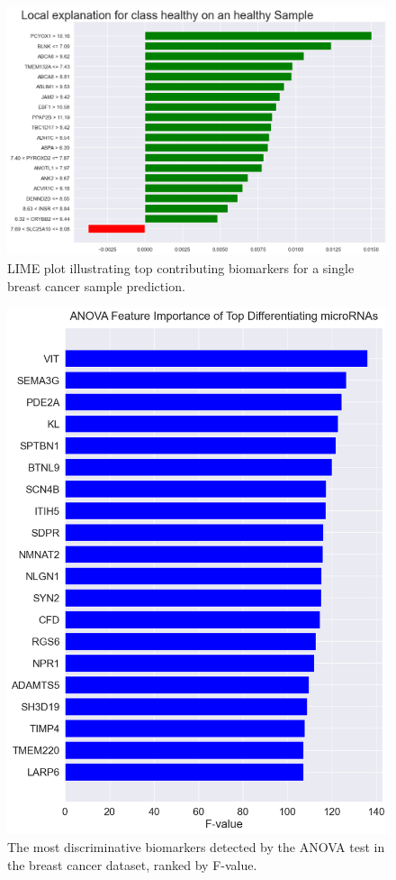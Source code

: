 \documentclass[journal]{IEEEtran}
\begin{document}

\begin{figure}[htbp]
\centering
\includegraphics[width=\linewidth]{breast_cancer_figures/differential/lime_local_explanation_plot_healthy.png}
\caption{LIME plot illustrating top contributing biomarkers for a single breast cancer sample prediction.}
\label{fig:breast_lime_bar}
\end{figure}

\begin{figure}[htbp]
\centering
\includegraphics[width=\linewidth]{breast_cancer_figures/differential/anova_features_plot.png}
\caption{The most discriminative biomarkers detected by the ANOVA test in the breast cancer dataset, ranked by F-value.}
\label{fig:breast_anova_features}
\end{figure}
\end{document}
